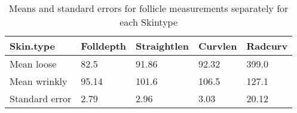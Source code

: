 %

\begin{table}[ht]
\centering
\caption{Means and standard errors for follicle measurements separately for each  Skintype}
\label{tab:skintype}
\vspace{0.1in}
\begin{tabular}{|p{0.6in}|p{0.6in}|p{0.6in}|p{0.6in}|p{0.6in}|} \hline
   Skin.type & Folldepth & Straightlen & Curvlen  & Radcurv\\   
    \hline
  Mean loose & 82.5 & 91.86 & 92.32 & 399.0  \\ 
  Mean wrinkly & 95.14 & 101.6 & 106.5 & 127.1 \\ 
  Standard error & 2.79 & 2.96 & 3.03 & 20.12  \\ 
   \hline
\end{tabular}
\end{table}

%


